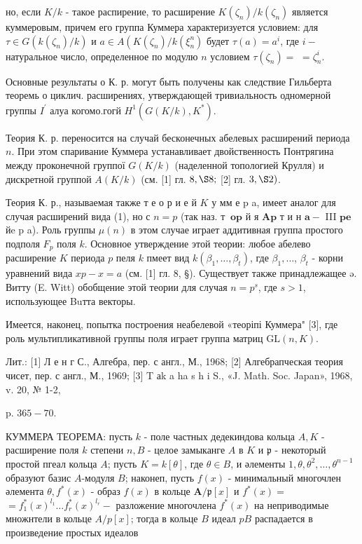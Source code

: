 \documentclass[10pt]{article}
\begin{document}
но, если $K / k$ - такое распирение, то расширение $K\left(\zeta_{n}\right) / k\left(\zeta_{n}\right)$ является куммеровым, причем его группа Куммера характеризуется условием: для $\tau \in G\left(k\left(\zeta_{n}\right) / k\right)$ и $a \in A\left(K\left(\zeta_{n}\right) / k\left(\xi_{n}^{n}\right)\right.$ будет $\tau(a)=a^{i}$, где $i-$ натуральное число, определенное по модулю $n$ условием $\tau\left(\zeta_{n}\right)=$ $=\zeta_{n}^{i}$.



Основные результаты о К. р. могут быть получены как следствие Гильберта теоремь о циклич. расширениях, утверждающей тривиальность одномерной группы $I^{\prime}$ алуа когомо.гогй $H^{1}\left(G(K / k), K^{*}\right)$.



Теория К. р. переносится на случай бесконечных абелевых расширений периода $n$. При этом спаривание Куммера устанавливает двойственность Понтрягина между проконечной группої $G(K / k)$ (наделенной топологией Крулля) и дискретной группой $A(K / k)$ (см. [1] гл. $8, \S 8 ;$ [2] гл. $3, \S 2)$.



Теория К. р., называемая также т е о р и е й $K$ у мм е $\mathrm{p}$ a, имеет аналог для случая расширений вида (1), но с $n=p$ (так наз. т $\mathbf{~} \mathbf{o} \mathbf{p}$ й я $\mathbf{A} \mathbf{p}$ т и н $\mathbf{a}-$ III $\mathbf{p} \mathbf{e}$ йe p a). Роль группы $\mu(n)$ в этом случае играет аддитивная группа простого подполя $F_{p}$ поля $k$. Основное утверждение этой теории: любое абелево расширение $K$ периода $p$ пеля $k$ пмеет вид $k\left(\beta_{1}, \ldots, \beta_{t}\right)$, где $\beta_{1}, \ldots$, $\beta_{t}$ - корни уравнений вида $x p-x=a$ (см. [1] гл. 8, §). Существует также принадлежащее ə. Витту (E. Witt) обобщение этой теории для случая $n=p^{s}$, где $s>1$, использующее Buтта векторы.



Имеется, наконец, попытка построения неабелевой «теоріпі Куммера" [3], где роль мультипликативной группы поля играет группа матриц $\mathrm{GL}(n, K)$.



Лит.: [1] Л е н г С., Алгебра, пер. с англ., М., 1968; [2] Алгебрапческая теория чисет, пер. с англ., М., 1969; [3] T аk a ha s h i S., «J. Math. Soc. Japan», 1968, v. 20, № 1-2,

p. $365-70$.



КУММЕРА ТЕОРЕМА: пусть $k$ - поле частных дедекиндова кольца $A, K$ - расширение поля $k$ степени $n, B$ - целое замыканге $A$ в $K$ и $\mathfrak{p}$ - некоторый простой пгеал кольца $A$; пусть $K=k[\theta]$, где $\theta \in B$, и әлементы $1, \theta, \theta^{2}, \ldots, \theta^{n-1}$ образуют базис $A$-модуля $B$; наконеп, пусть $f(x)$ - минимальный многочлен әлемента $\theta, f^{*}(x)$ - образ $f(x)$ в кольце $\boldsymbol{A} / \mathfrak{p}[x]$ и $f^{*}(x)=$ $=f_{1}^{*}(x)^{l_{1}} \ldots f_{r}^{*}(x)^{l_{r}}-$ разложение многочлена $f^{*}(x)$ на неприводимые множнтели в кольце $A / p[x]$; тогда в кольце $B$ идеал $p B$ распадается в произведение простых идеалов
\end{document}
